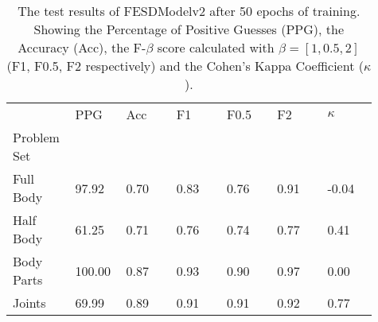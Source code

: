     \begin{table}[!htbp]
        \caption[Test Results of FESDModelv2]{The test results of FESDModelv2 after 50 epochs of training. Showing the Percentage of Positive Guesses (PPG), the Accuracy (Acc), the F-$\beta$ score calculated with $\beta = [1, 0.5, 2]$ (F1, F0.5, F2 respectively) and the Cohen's Kappa Coefficient ($\kappa$).}
        \label{tab:res_v2}
        \begin{tabular}{p{0.13\linewidth}p{0.13\linewidth}p{0.13\linewidth}p{0.13\linewidth}p{0.13\linewidth}p{0.13\linewidth}p{0.13\linewidth}}
\hline
{} &    PPG &  Acc &   F1 &  F0.5 &   F2 &  $\kappa$ \\
Problem Set   &        &      &      &       &      &           \\
\hline
Full Body  &  97.92 & 0.70 & 0.83 &  0.76 & 0.91 &     -0.04 \\
Half Body  &  61.25 & 0.71 & 0.76 &  0.74 & 0.77 &      0.41 \\
Body Parts & 100.00 & 0.87 & 0.93 &  0.90 & 0.97 &      0.00 \\
Joints     &  69.99 & 0.89 & 0.91 &  0.91 & 0.92 &      0.77 \\
\hline
\end{tabular}

    \end{table}
  